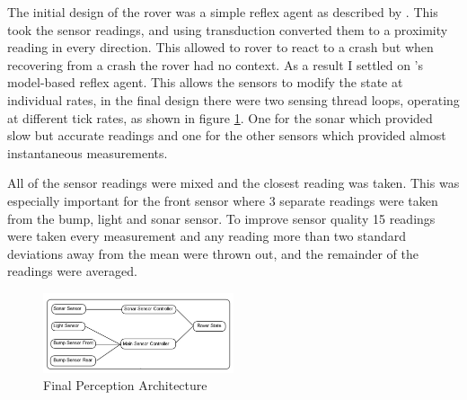 \documentclass[a4paper,12pt,twocolumn]{report}
\begin{document}


The initial design of the rover was a simple reflex agent as described by \cite{russell1995modern}. This took the sensor readings, and using transduction converted them to a proximity reading in every direction. This allowed to rover to react to a crash but when recovering from a crash the rover had no context. As a result I settled on \cite{russell1995modern}'s model-based reflex agent. This allows the sensors to modify the state at individual rates, in the final design there were two sensing thread loops, operating at different tick rates, as shown in figure \ref{fig:perception}. One for the sonar which provided slow but accurate readings and one for the other sensors which provided almost instantaneous measurements.

All of the sensor readings were mixed and the closest reading was taken. This was especially important for the front sensor where 3 separate readings were taken from the bump, light and sonar sensor. To improve sensor quality 15 readings were taken every measurement and any reading more than two standard deviations away from the mean were thrown out, and the remainder of the readings were averaged.

\begin{figure}
 \includegraphics[width=0.5\textwidth]{sensing-diagram}
 \caption{Final Perception Architecture}
 \label{fig:perception}
\end{figure}
\end{document}
